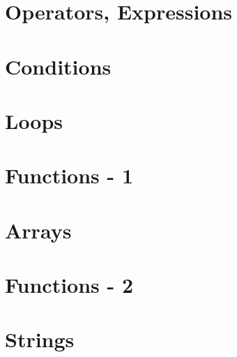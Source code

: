 \documentclass[11pt]{exam}
\begin{document}
\newpage 
\section{Operators, Expressions}


\newpage 
\section{Conditions}


\newpage 
\section{Loops}


\newpage 
\section{Functions - 1}


\newpage 
\section{Arrays}


\newpage 
\section{Functions - 2}


\newpage 
\section{Strings}

\end{document}
